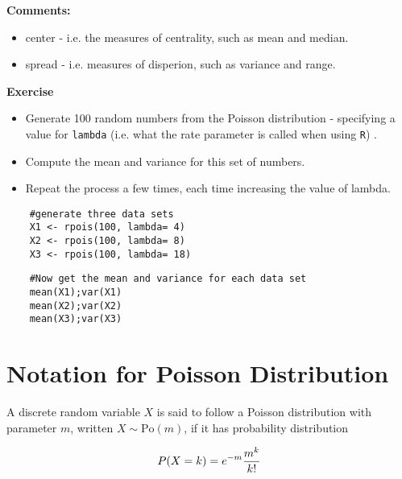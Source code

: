 \documentclass[]{article}
\begin{document}
\Large
\noindent \textbf{Comments:}
\begin{itemize}
	\item center - i.e. the measures of centrality, such as mean and median.
	\item spread - i.e. measures of disperion, such as variance and range.
\end{itemize} 


\textbf{Exercise}
\begin{itemize}
	\item Generate 100 random numbers from the Poisson distribution - specifying a value for \texttt{lambda} (i.e. what the rate parameter is called when using \texttt{R}) .
	\item Compute the mean and variance for this set of numbers.
	\item Repeat the process a few times, each time increasing the value of lambda.
\end{itemize}
\begin{framed}
	\begin{verbatim}
	#generate three data sets
	X1 <- rpois(100, lambda= 4)
	X2 <- rpois(100, lambda= 8)
	X3 <- rpois(100, lambda= 18)
	\end{verbatim}
\end{framed}


\begin{framed}
	\begin{verbatim}
	#Now get the mean and variance for each data set
	mean(X1);var(X1)
	mean(X2);var(X2)
	mean(X3);var(X3)
	\end{verbatim}
\end{framed}

\section{Notation for Poisson Distribution}
A discrete random variable $X$ is said to follow a Poisson distribution with parameter $m$, written $X \sim \mbox{Po}(m)$, if it has probability distribution


\[ P(X=k) = e^{-m} {m^k \over k!} \]
\end{document}
